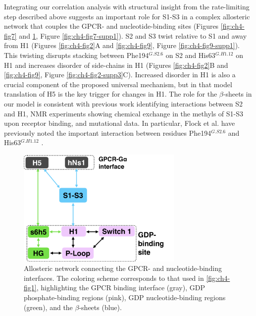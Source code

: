 \documentclass[../main.tex]{subfiles}
\begin{document}
        Integrating our correlation analysis with structural insight from the rate-limiting step described above suggests an important role for S1-S3 in a complex allosteric network that couples the GPCR- and nucleotide-binding sites (Figures \ref{fig:ch4-fig7} and \ref{fig:ch4-fig8}, Figure \ref{fig:ch4-fig7-supp1}). S2 and S3 twist relative to S1 and away from H1 (Figures \ref{fig:ch4-fig2}A and \ref{fig:ch4-fig9}, Figure \ref{fig:ch4-fig9-supp1}). This twisting disrupts stacking between Phe194$^{G.S2.6}$ on S2 and His63$^{G.H1.12}$ on H1 and increases disorder of side-chains in H1 (Figures \ref{fig:ch4-fig2}B and \ref{fig:ch4-fig9}, Figure \ref{fig:ch4-fig2-supp3}C). Increased disorder in H1 is also a crucial component of the proposed universal mechanism, but in that model translation of H5 is the key trigger for changes in H1. The role for the $\beta$-sheets in our model is consistent with previous work identifying interactions between S2 and H1\cite{Flock:2015dj}, NMR experiments showing chemical exchange in the methyls of S1-S3 upon receptor binding\cite{Toyama:2017gy}, and mutational data. In particular, Flock et al. have previously noted the important interaction between residues Phe194$^{G.S2.6}$ and His63$^{G.H1.12}$ \cite{Flock:2015dj}.

        \begin{figure}[!htb] %
            \centering
            \includegraphics[width=3.16in]{ch4-fig8.png}
            \caption[Allosteric network connecting the GPCR- and nucleotide-binding interfaces.]
                {Allosteric network connecting the GPCR- and nucleotide-binding interfaces. The coloring scheme corresponds to that used in \ref{fig:ch4-fig1}, highlighting the GPCR binding interface (gray), GDP phosphate-binding regions (pink), GDP nucleotide-binding regions (green), and the $\beta$-sheets (blue).}
            \label{fig:ch4-fig8}
        \end{figure}
\end{document}
